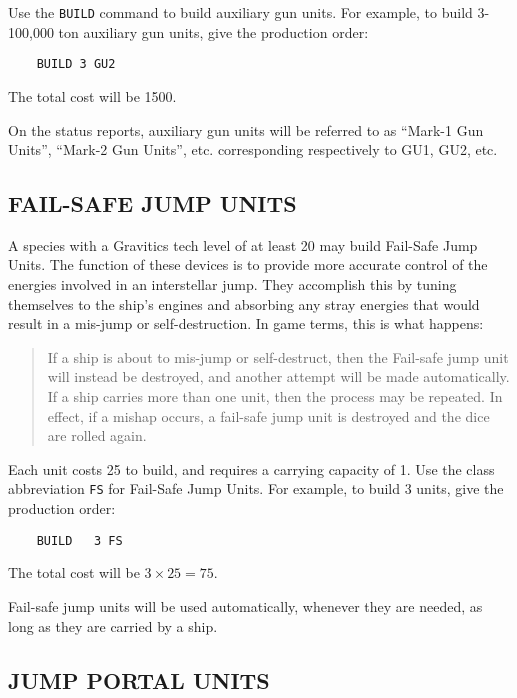 \documentclass[10pt,titlepage]{article}
\begin{document}
Use the \texttt{BUILD} command to build auxiliary gun units.  For example, to build
3-100,000 ton auxiliary gun units, give the production order:

\begin{verbatim}
	BUILD 3 GU2\end{verbatim} 

The total cost will be 1500.

On the status reports, auxiliary gun units will be referred to as ``Mark-1 Gun
Units'', ``Mark-2 Gun Units'', etc. corresponding respectively to GU1, GU2, etc.

\newpage
\subsection{FAIL-SAFE JUMP UNITS}

A species with a Gravitics tech level of at least 20 may build Fail-Safe Jump
Units.  The function of these devices is to provide more accurate control of
the energies involved in an interstellar jump.  They accomplish this by tuning
themselves to the ship's engines and absorbing any stray energies that would
result in a mis-jump or self-destruction.  In game terms, this is what happens:

\begin{quotation}
	If a ship is about to mis-jump or self-destruct, then the
	Fail-safe jump unit will instead be destroyed, and another
	attempt will be made automatically.  If a ship carries more
	than one unit, then the process may be repeated.  In effect,
	if a mishap occurs, a fail-safe jump unit is destroyed and
	the dice are rolled again.\end{quotation} 

Each unit costs 25 to build, and requires a carrying capacity of 1.  Use the
class abbreviation \texttt{FS} for Fail-Safe Jump Units.  For example, to build 3
units, give the production order:

\begin{verbatim}
	BUILD	3 FS\end{verbatim} 

\noindent The total cost will be $3 \times 25 = 75$.

\noindent Fail-safe jump units will be used automatically, whenever they are needed, as
long as they are carried by a ship.

\newpage
\subsection{JUMP PORTAL UNITS}
\end{document}
